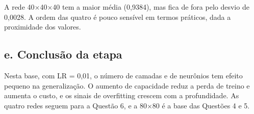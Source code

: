 A rede 40$\times$40$\times$40 tem a maior média (0,9384), mas fica de fora pelo desvio de 0,0028. A ordem das quatro é pouco sensível em termos práticos, dada a proximidade dos valores.

\subsection*{e. Conclusão da etapa}

Nesta base, com LR = 0,01, o número de camadas e de neurônios tem efeito pequeno na generalização. O aumento de capacidade reduz a perda de treino e
aumenta o custo, e os sinais de overfitting crescem com a profundidade. As quatro redes seguem para a Questão 6, e a 80$\times$80 é a base das Questões 4 e 5.

\FloatBarrier
